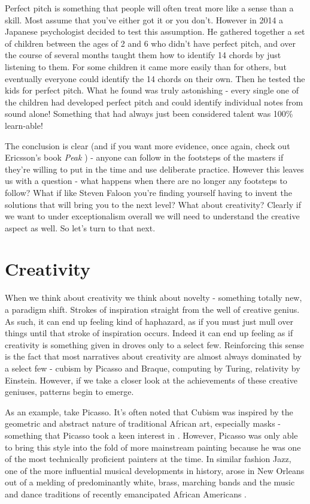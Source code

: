 \documentclass[11pt]{book}
\begin{document}
Perfect pitch is something that people will often treat more like a sense than a skill. Most assume that you've either got it or you don't. However in 2014 a Japanese psychologist decided to test this assumption. He gathered together a set of children between the ages of 2 and 6 who didn't have perfect pitch, and over the course of several months taught them how to identify 14 chords by just listening to them. For some children it came more easily than for others, but eventually everyone could identify the 14 chords on their own. Then he tested the kids for perfect pitch. What he found was truly astonishing - every single one of the children had developed perfect pitch and could identify individual notes from sound alone! Something that had always just been considered talent was 100\% learn-able!
\newline

The conclusion is clear (and if you want more evidence, once again, check out Ericsson's book \textit{Peak} \cite{ericsson}) - anyone can follow in the footsteps of the masters if they're willing to put in the time and use deliberate practice. However this leaves us with a question - what happens when there are no longer any footsteps to follow? What if like Steven Faloon you're finding yourself having to invent the solutions that will bring you to the next level? What about creativity? Clearly if we want to under exceptionalism overall we will need to understand the creative aspect as well. So let's turn to that next. 

\section{Creativity}
When we think about creativity we think about novelty - something totally new, a paradigm shift. Strokes of inspiration straight from the well of creative genius. As such, it can end up feeling kind of haphazard, as if you must just mull over things until that stroke of inspiration occurs. Indeed it can end up feeling as if creativity is something given in droves only to a select few. Reinforcing this sense is the fact that most narratives about creativity are almost always dominated by a select few - cubism by Picasso and Braque, computing by Turing, relativity by Einstein. However, if we take a closer look at the achievements of these creative geniuses, patterns begin to emerge. 
\newline

As an example, take Picasso. It's often noted that Cubism was inspired by the geometric and abstract nature of traditional African art, especially masks - something that Picasso took a keen interest in \cite{sabine}. However, Picasso was only able to bring this style into the fold of more mainstream painting because he was one of the most technically proficient painters at the time. In similar fashion Jazz, one of the more influential musical developments in history, arose in New Orleans out of a melding of predominantly white, brass, marching bands and the music and dance traditions of recently emancipated African Americans \cite{jazz}.
\newline
\end{document}
